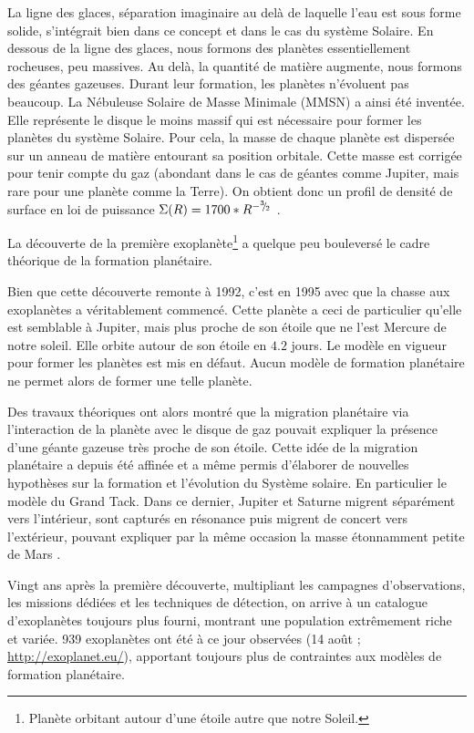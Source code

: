 La ligne des glaces, séparation imaginaire au delà de laquelle l'eau est sous forme solide, s'intégrait bien dans ce concept et
dans le cas du système Solaire. En dessous de la ligne des glaces, nous formons des planètes essentiellement rocheuses, peu
massives. Au delà, la quantité de matière augmente, nous formons des géantes gazeuses. Durant leur formation, les planètes
n'évoluent pas beaucoup. La Nébuleuse Solaire de Masse Minimale (MMSN) a ainsi été inventée. Elle représente le disque le moins
massif qui est nécessaire pour former les planètes du système Solaire. Pour cela, la masse de chaque planète est dispersée
sur un anneau de matière entourant sa position orbitale.
Cette masse est corrigée pour tenir compte du gaz (abondant dans le cas de géantes comme Jupiter, mais rare pour une planète
comme la Terre). On obtient donc un profil de densité de surface en loi de puissance $\Sigma(R)=1700 * R^{-{{}^{3\!\!}/ _{\!2}}}$ \citep{
weidenschilling1977distribution, hayashi1981structure}.

La découverte de la première exoplanète\footnote{Planète orbitant autour d'une étoile autre que notre Soleil.}
\citep{wolszczan1992planetary} a quelque peu bouleversé le cadre théorique de la formation planétaire.

Bien que cette découverte remonte à 1992, c'est en 1995 avec  \citep{mayor1995jupiter} que la chasse aux
exoplanètes a véritablement commencé. Cette planète a ceci de particulier qu'elle est semblable à Jupiter, mais plus proche de
son étoile que ne l'est Mercure de notre soleil. Elle orbite autour de son étoile en $4.2$ jours. Le modèle en
vigueur pour former les planètes est mis en défaut. Aucun modèle de formation planétaire ne permet alors de former une telle
planète. 

Des travaux théoriques ont alors montré que la migration planétaire via l'interaction de la planète avec le disque de gaz
pouvait expliquer la présence d'une géante gazeuse très proche de son étoile. Cette idée de la migration planétaire a depuis été
affinée et a même permis d'élaborer de nouvelles hypothèses sur la formation et l'évolution du Système solaire. En particulier
le modèle du \og Grand Tack\fg \citep{morbidelli2007dynamics, pierens2011twophase}. Dans ce dernier, Jupiter et
Saturne migrent séparément vers l'intérieur, sont capturés en résonance puis migrent de concert vers l'extérieur, pouvant
expliquer par la même occasion la masse étonnamment petite de Mars \citep{walsh2011low}. 

Vingt ans après la première découverte, multipliant les campagnes d'observations, les missions dédiées et les techniques
de détection, on arrive à un catalogue d'exoplanètes toujours plus fourni, montrant une
population extrêmement riche et variée. 939 exoplanètes ont été à ce jour observées (14 août ; \url{http://exoplanet.eu/}),
apportant toujours plus de contraintes aux modèles de formation planétaire. 

